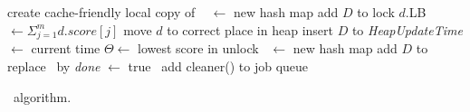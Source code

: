 \begin{algorithm*}[htb]
\begin{multicols}{2}
\begin{algorithmic}[1]
        			\Comment create cache-friendly local copy of \DMap\ %
        			\State \TMap[i] $\leftarrow$ new hash map
            			\State add $D$ to \TMap[i] \label{l:hash-chash}
            		\EndFor
\EndProcedure
\Statex 
{} 
\State lock \DHeap \label{l:lock-heap}
	  \label{l:for-all-heap-docs}
		\State $d$.LB $\leftarrow \Sigma_{j=1}^{m} d.score[j]$
		\State move $d$ to correct place in heap \label{l:fix-heap}
	\EndFor
\State insert $D$ to \DHeap 
\State \emph{HeapUpdateTime} $\leftarrow$ current time 
\State  $\Theta \leftarrow$ lowest score in \DHeap
\EndIf
\State unlock \DHeap  \label{l:unlock-heap}
\EndProcedure
%
%
\Statex 
{} \label{l:clean-start}
\If{$|\DMap | > \Phi $} 
\State \LDMap\ $\leftarrow$ new hash map \label{l:clean-local-copy}
{} 
	\State add   $D$ to \LDMap
\EndIf
\EndFor
\State replace \DMap\ by \LDMap \label{l:clean-replace}
\EndIf
 \label{l:clean-stop-cond}
\State \emph{done} $\leftarrow$ true
\Else\ add {\sc cleaner()} to job queue
\EndIf
\label{l:clean-end}
\EndProcedure 
\end{algorithmic}
\end{multicols}
\caption{\alg\ algorithm.}
\label{alg:sparta}
\end{algorithm*}